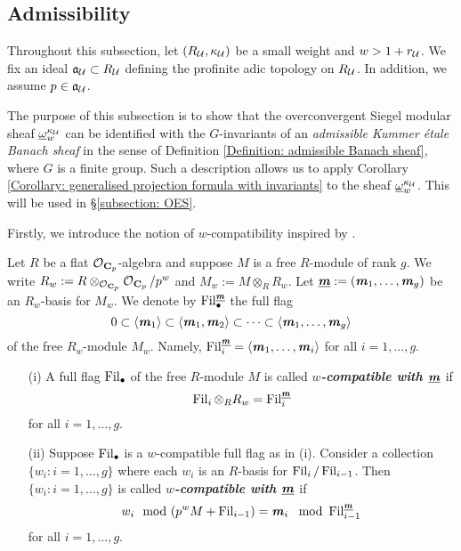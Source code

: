 \subsection{Admissibility}\label{subsection: admissibility}
Throughout this subsection, let $(R_{\operatorname{\mathcal{U}}}, \kappa_{\operatorname{\mathcal{U}}})$ be a small weight and $w>1+r_{\operatorname{\mathcal{U}}}$. We fix an ideal $\operatorname{\mathfrak{a}}_{\operatorname{\mathcal{U}}}\subset R_{\operatorname{\mathcal{U}}}$ defining the profinite adic topology on $R_{\operatorname{\mathcal{U}}}$. In addition, we assume $p\in \operatorname{\mathfrak{a}}_{\operatorname{\mathcal{U}}}$.

The purpose of this subsection is to show that the overconvergent Siegel modular sheaf $\underline{\omega}^{\kappa_{\operatorname{\mathcal{U}}}}_w$ can be identified with the $G$-invariants of an \emph{admissible Kummer \'etale Banach sheaf} in the sense of Definition \ref{Definition: admissible Banach sheaf}, where $G$ is a finite group. Such a description allows us to apply Corollary \ref{Corollary: generalised projection formula with invariants} to the sheaf $\underline{\omega}^{\kappa_{\operatorname{\mathcal{U}}}}_w$. This will be used in \S \ref{subsection: OES}.

Firstly, we introduce the notion of $w$-compatibility inspired by \cite[\S 4.5]{AIP-2015}.

\begin{Definition}\label{Definition: w-compatible}
Let $R$ be a flat $\operatorname{\mathcal{O}}_{\operatorname{\mathbf{C}}_p}$-algebra and suppose $M$ is a free $R$-module of rank $g$. We write $R_w:=R\otimes_{\operatorname{\mathcal{O}}_{\operatorname{\mathbf{C}}_p}}\operatorname{\mathcal{O}}_{\operatorname{\mathbf{C}}_p}/p^w$ and $M_w:=M\otimes_R R_w$. Let $\underline{\operatorname{\textbf{\textit{m}}}}:=(\operatorname{\textbf{\textit{m}}}_1, \ldots, \operatorname{\textbf{\textit{m}}}_g)$ be an $R_w$-basis for $M_w$. We denote by $\operatorname{Fil}_{\bullet}^{\underline{\operatorname{\textbf{\textit{m}}}}}$ the full flag
$$0\subset \langle\operatorname{\textbf{\textit{m}}}_1\rangle\subset \langle \operatorname{\textbf{\textit{m}}}_1, \operatorname{\textbf{\textit{m}}}_2\rangle\subset\cdots\subset\langle \operatorname{\textbf{\textit{m}}}_1, \ldots, \operatorname{\textbf{\textit{m}}}_g\rangle$$
of the free $R_w$-module $M_w$. Namely, $\operatorname{Fil}_i^{\underline{\operatorname{\textbf{\textit{m}}}}}=\langle \operatorname{\textbf{\textit{m}}}_1, \ldots, \operatorname{\textbf{\textit{m}}}_i\rangle$ for all $i=1, \ldots, g$.
\begin{enumerate}
\item[(i)] A full flag $\operatorname{Fil}_{\bullet}$ of the free $R$-module $M$ is called \textbf{\textit{$w$-compatible with $\underline{\operatorname{\textbf{\textit{m}}}}$}} if 
$$\operatorname{Fil}_{i}\otimes_{R}R_w=\operatorname{Fil}_i^{\underline{\operatorname{\textbf{\textit{m}}}}}$$
for all $i=1, \ldots, g$.
\item[(ii)] Suppose $\operatorname{Fil}_{\bullet}$ is a $w$-compatible full flag as in (i). Consider a collection $\{w_i: i=1, \ldots, g\}$ where each $w_i$ is an $R$-basis for $\operatorname{Fil}_i/\operatorname{Fil}_{i-1}$. Then $\{w_i: i=1, \ldots, g\}$ is called \textbf{\textit{$w$-compatible with $\underline{\operatorname{\textbf{\textit{m}}}}$}} if 
$$w_i\mod (p^wM+\operatorname{Fil}_{i-1})=\operatorname{\textbf{\textit{m}}}_i\mod {\operatorname{Fil}}_{i-1}^{\underline{\operatorname{\textbf{\textit{m}}}}}$$
for all $i=1, \ldots, g$.
\end{enumerate}
\end{Definition} 


